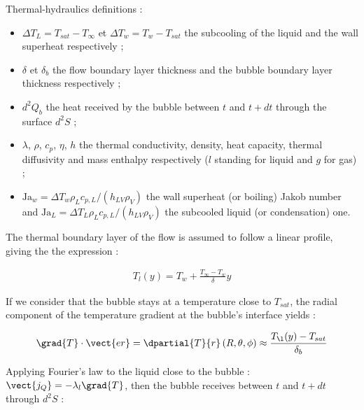 \npar
Thermal-hydraulics definitions :
\begin{itemize}
\item $\Delta T_{L} = T_{sat}-T_{\infty}$ et $\Delta T_{w}=T_{w}-T_{sat}$ the subcooling of the liquid and the wall superheat respectively ;
\item $\delta$ et $\delta_{b}$ the flow boundary layer thickness and the bubble boundary layer thickness respectively ;
\item $d^{2} Q_{b}$ the heat received by the bubble between $t$ and $t+dt$ through the surface $d^{2}S$ ;
\item $\lambda$, $\rho$, $c_{p}$, $\eta$, $h$ the thermal conductivity, density, heat capacity, thermal diffusivity and mass enthalpy respectively ($l$ standing for liquid  and $g$ for gas) ;
\item $\text{Ja}_{w}=\Delta T_{w} \rho_{L}c_{p,L}/(h_{LV}\rho_{V})$ the wall superheat (or boiling) Jakob number and $\text{Ja}_{L}=\Delta T_{L} \rho_{L}c_{p,L}/(h_{LV}\rho_{V})$ the subcooled liquid (or condensation) one.
\end{itemize}

\npar


The thermal boundary layer of the flow is assumed to follow a linear profile, giving the the expression :

\begin{align}
T_{l}\left(y\right)=T_{w}+\frac{T_{\infty}-T_{w}}{\delta} y
\end{align}


If we consider that the bubble stays at a temperature close to $T_{sat}$, the radial component of the temperature gradient at the bubble's interface yields :

\begin{align}
\grad{T} \cdot \vect{er} = \dpartial{T}{r}\left(R, \theta, \phi\right)\approx\frac{T_{\l}(y)-T_{sat}}{\delta_{b}}
\end{align}

\npar



Applying Fourier's law to the liquid close to the bubble : $\vect{j_{Q}}=-\lambda_{l} \grad{T}$, then the bubble receives between $t$ and $t+dt$ through $d^{2}S$ :

